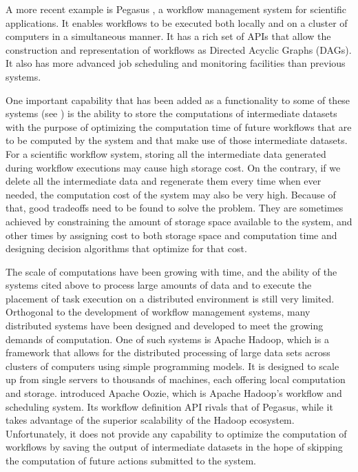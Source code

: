 A more recent example is Pegasus \citep{she2008workflow}, a workflow management system for scientific applications.  It enables workflows to be executed both locally and on a cluster of computers in a simultaneous manner.  It has a rich set of APIs that allow the construction and representation of workflows as Directed Acyclic Graphs (DAGs).  It also has more advanced job scheduling and monitoring facilities than previous systems.  

One important capability that has been added as a functionality to some of these systems (see \cite{yuan2012data}) is the ability to store the computations of intermediate datasets with the purpose of optimizing the computation time of future workflows that are to be computed by the system and that make use of those intermediate datasets. For a scientific workflow system, storing all the intermediate data generated during workflow executions may cause high storage cost.  On the contrary, if we delete all the intermediate data and regenerate them every time when ever needed, the computation cost of the system may also be very high. Because of that, good tradeoffs need to be found to solve the problem.  They are sometimes achieved by constraining the amount of storage space available to the system, and other times by assigning cost to both storage space and computation time and designing decision algorithms that optimize for that cost. 

The scale of computations have been growing with time, and the ability of the systems cited above to process large amounts of data and to execute the placement of task execution on a distributed environment is still very limited.  Orthogonal to the development of workflow management systems, many distributed systems have been designed and developed to meet the growing demands of computation.  One of such systems is Apache Hadoop, which is a framework that allows for the distributed processing of large data sets across clusters of computers using simple programming models. It is designed to scale up from single servers to thousands of machines, each offering local computation and storage. \cite{islam2012oozie} introduced Apache Oozie, which is Apache Hadoop's workflow and scheduling system.  Its workflow definition API rivals that of Pegasus, while it takes advantage of the superior scalability of the Hadoop ecosystem. Unfortunately, it does not provide any capability to optimize the computation of workflows by saving the output of intermediate datasets in the hope of skipping the computation of future actions submitted to the system.

